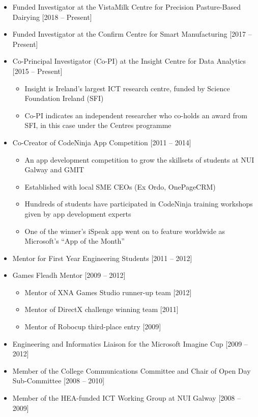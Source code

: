 \documentclass[10pt,a4paper]{res} %
\begin{document}
\begin{resume}
\begin{itemize} \itemsep -2pt
\item Funded Investigator at the VistaMilk Centre for Precision Pasture-Based Dairying [2018 -- Present]
\item Funded Investigator at the Confirm Centre for Smart Manufacturing [2017 -- Present]
\item Co-Principal Investigator (Co-PI) at the Insight Centre for Data Analytics [2015 -- Present]
\begin{itemize} \itemsep -2pt
\item Insight is Ireland's largest ICT research centre, funded by Science Foundation Ireland (SFI)
\item Co-PI indicates an independent researcher who co-holds an award from SFI, in this case under the Centres programme
\end{itemize}
\item Co-Creator of CodeNinja App Competition [2011 -- 2014]
\begin{itemize} \itemsep -2pt
\item An app development competition to grow the skillsets of students at NUI Galway and GMIT
\item Established with local SME CEOs (Ex Ordo, OnePageCRM)
\item Hundreds of students have participated in CodeNinja training workshops given by app development experts
\item One of the winner's iSpeak app went on to feature worldwide as Microsoft's ``App of the Month''
\end{itemize}
\item Mentor for First Year Engineering Students [2011 -- 2012]
\item Games Fleadh Mentor [2009 -- 2012]
\begin{itemize} \itemsep -2pt
\item Mentor of XNA Games Studio runner-up team [2012]
\item Mentor of DirectX challenge winning team [2011] 
\item Mentor of Robocup third-place entry [2009]
\end{itemize}
\item Engineering and Informatics Liaison for the Microsoft Imagine Cup [2009 -- 2012]
\item Member of the College Communications Committee and Chair of Open Day Sub-Committee [2008 -- 2010]
\item Member of the HEA-funded ICT Working Group at NUI Galway [2008 -- 2009]

\end{itemize}
\end{resume}
\end{document}
